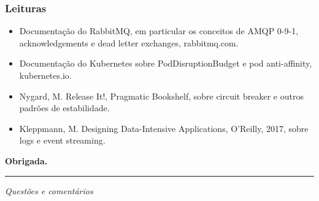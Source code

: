 \documentclass[aspectratio=169]{beamer}
\begin{document}
\begin{frame}
\frametitle{Leituras}
\begin{itemize}
    \setlength\itemsep{0.4cm}
    \item Documentação do RabbitMQ, em particular os conceitos de AMQP 0-9-1, acknowledgements e dead letter exchanges, rabbitmq.com.
    \item Documentação do Kubernetes sobre PodDisruptionBudget e pod anti-affinity, kubernetes.io.
    \item Nygard, M. Release It!, Pragmatic Bookshelf, sobre circuit breaker e outros padrões de estabilidade.
    \item Kleppmann, M. Designing Data-Intensive Applications, O'Reilly, 2017, sobre logs e event streaming.
\end{itemize}
\end{frame}

\begin{frame}[plain]
  \vspace*{3cm}
  \begin{center}
    \Huge\bfseries\textcolor{TextEspresso}{Obrigada.}\par
    \vspace{0.5cm}
    {\color{NudeTaupe}\rule{2cm}{0.5pt}}\par
    \vspace{0.5cm}
    \Large\textcolor{TextEspresso}{\itshape Questões e comentários}
  \end{center}
\end{frame}
\end{document}
